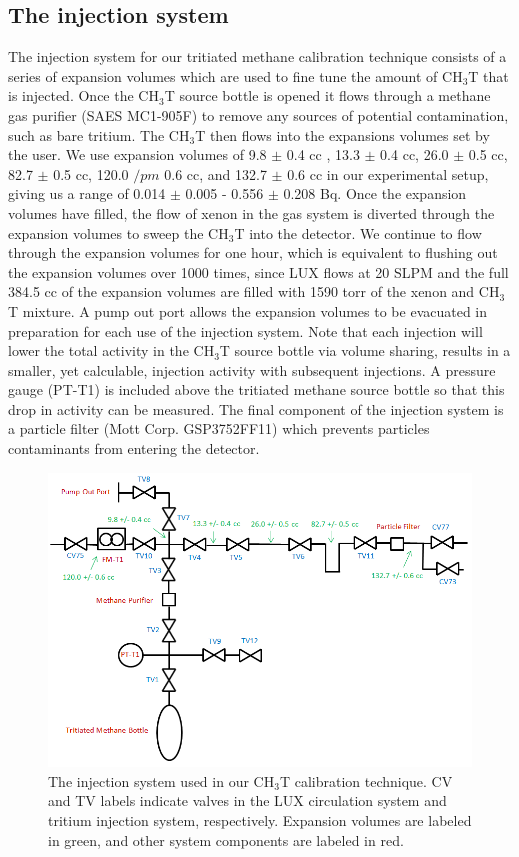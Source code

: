\subsection{The injection system}

The injection system for our tritiated methane calibration technique consists of a series of expansion volumes which are used to fine tune the amount of CH$_3$T that is injected.  Once the CH$_3$T source bottle is opened it flows through a methane gas purifier (SAES MC1-905F) to remove any sources of potential contamination, such as bare tritium.  The CH$_3$T then flows into the expansions volumes set by the user.  We use expansion volumes of 9.8 $\pm$ 0.4 cc , 13.3 $\pm$ 0.4 cc, 26.0 $\pm$ 0.5 cc, 82.7 $\pm$ 0.5 cc, 120.0 $/pm$ 0.6 cc, and 132.7 $\pm$ 0.6 cc in our experimental setup, giving us a range of 0.014 $\pm$  0.005 - 0.556 $\pm$ 0.208 Bq.  Once the expansion volumes have filled, the flow of xenon in the gas system is diverted through the expansion volumes to sweep the CH$_3$T into the detector.  We continue to flow through the expansion volumes for one hour, which is equivalent to flushing out the expansion volumes over 1000 times, since LUX flows at 20 SLPM and the full 384.5 cc of the expansion volumes are filled with 1590 torr of the xenon and CH$_3$T mixture.  A pump out port allows the expansion volumes to be evacuated in preparation for each use of the injection system.  Note that each injection will lower the total activity in the CH$_3$T source bottle via volume sharing, results in a smaller, yet calculable, injection activity with subsequent injections.  A pressure gauge (PT-T1) is included above the tritiated methane source bottle so that this drop in activity can be measured.  The final component of the injection system is a particle filter (Mott Corp. GSP3752FF11) which prevents particles contaminants from entering the detector.

\begin{figure}[H]
\centering
\includegraphics[scale=0.3]{TritiumPlumbingUpdated.png}
\caption{The injection system used in our CH$_3$T calibration technique. CV and TV labels indicate valves in the LUX circulation system and tritium injection system, respectively.  Expansion volumes are labeled in green, and other system components are labeled in red.}
\label{fig:LUXSys}
\end{figure}

